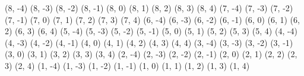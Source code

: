                 (8, -4)
                (8, -3)
                (8, -2)
                (8, -1)
                (8, 0)
                (8, 1)
                (8, 2)
                (8, 3)
                (8, 4)
                (7, -4)
                (7, -3)
                (7, -2)
                (7, -1)
                (7, 0)
                (7, 1)
                (7, 2)
                (7, 3)
                (7, 4)
                (6, -4)
                (6, -3)
                (6, -2)
                (6, -1)
                (6, 0)
                (6, 1)
                (6, 2)
                (6, 3)
                (6, 4)
                (5, -4)
                (5, -3)
                (5, -2)
                (5, -1)
                (5, 0)
                (5, 1)
                (5, 2)
                (5, 3)
                (5, 4)
                (4, -4)
                (4, -3)
                (4, -2)
                (4, -1)
                (4, 0)
                (4, 1)
                (4, 2)
                (4, 3)
                (4, 4)
                (3, -4)
                (3, -3)
                (3, -2)
                (3, -1)
                (3, 0)
                (3, 1)
                (3, 2)
                (3, 3)
                (3, 4)
                (2, -4)
                (2, -3)
                (2, -2)
                (2, -1)
                (2, 0)
                (2, 1)
                (2, 2)
                (2, 3)
                (2, 4)
                (1, -4)
                (1, -3)
                (1, -2)
                (1, -1)
                (1, 0)
                (1, 1)
                (1, 2)
                (1, 3)
                (1, 4)